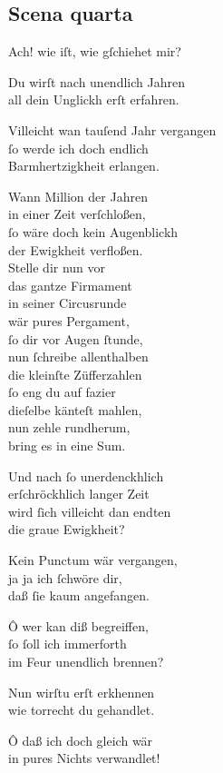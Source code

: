 \documentclass{ees}
\newenvironment{lyrics}[1]{%
  \subsection{#1}\nopagebreak%
  \begin{lyricslist}%
  \let\voice\item%
}{%
  \end{lyricslist}%
}
\begin{document}
\begin{lyrics}{Scena quarta}
  \voice[Judas]
  Ach! wie iſt, wie gſchiehet mir?

  \voice[St: Michael]
  Du wirſt nach unendlich Jahren\\
  all dein Unglickh erſt erfahren.

  \voice[Judas]
  Villeicht wan tauſend Jahr vergangen\\
  ſo werde ich doch endlich\\
  Barmhertzigkheit erlangen.

  \voice[St: Michael]
  Wann Million der Jahren\\
  in einer Zeit verſchloßen,\\
  ſo wäre doch kein Augenblickh\\
  der Ewigkheit verfloßen.\\
  Stelle dir nun vor\\
  das gantze Firmament\\
  in seiner Circusrunde\\
  wär pures Pergament,\\
  ſo dir vor Augen ſtunde,\\
  nun ſchreibe allenthalben\\
  die kleinſte Züfferzahlen\\
  ſo eng du auf fazier\\
  dieſelbe känteſt mahlen,\\
  nun zehle rundherum,\\
  bring es in eine Sum.

  \voice[Judas]
  Und nach ſo unerdenckhlich\\
  erſchröckhlich langer Zeit\\
  wird ſich villeicht dan endten\\
  die graue Ewigkheit?

  \voice[St: Michael]
  Kein Punctum wär vergangen,\\
  ja ja ich ſchwöre dir,\\
  daß ſie kaum angefangen.

  \voice[Judas]
  Ô wer kan diß begreiffen,\\
  ſo ſoll ich immerforth\\
  im Feur unendlich brennen?

  \voice[St: Michael]
  Nun wirſtu erſt erkhennen\\
  wie torrecht du gehandlet.
  \enlargethispage\baselineskip

  \voice[Judas]
  Ô daß ich doch gleich wär\\
  in pures Nichts verwandlet!
\end{lyrics}
\end{document}
